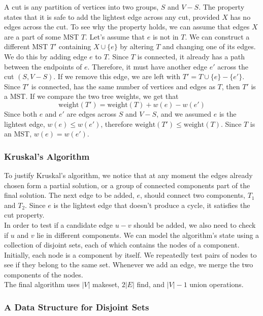 A cut is any partition of vertices into two groups, $S$ and $V - S$.
The property states that it is safe to add the lightest edge across any cut, provided $X$ has no edges across the cut.
To see why the property holds, we can assume that edges $X$ are a part of some MST $T$.
Let's assume that $e$ is not in $T$.
We can construct a different MST $T'$ containing $X \cup \{e\}$ by altering $T$ and changing one of its edges.
We do this by adding edge $e$ to $T$.
Since $T$ is connected, it already has a path between the endpoints of $e$.
Therefore, it must have another edge $e'$ across the cut $(S, V - S)$.
If we remove this edge, we are left with $T' = T \cup \{e\} - \{e'\}$.
Since $T'$ is connected, has the same number of vertices and edges as $T$, then $T'$ is a MST.
If we compare the two tree weights, we get that
$$\text{weight}(T') = \text{weight}(T) + w(e) - w(e')$$
Since both $e$ and $e'$ are edges across $S$ and $V - S$, and we assumed $e$ is the lightest edge, $w(e) \leq w(e')$, therefore $\text{weight}(T') \leq \text{weight}(T)$.
Since $T$ is an MST, $w(e) = w(e')$.

\subsubsection{Kruskal's Algorithm}
To justify Kruskal's algorithm, we notice that at any moment the edges already chosen form a partial solution, or a group of connected components part of the final solution.
The next edge to be added, $e$, should connect two components, $T_1$ and $T_2$.
Since $e$ is the lightest edge that doesn't produce a cycle, it satisfies the cut property.\\
In order to test if a candidate edge $u - v$ should be added, we also need to check if $u$ and $v$ lie in different components.
We can model the algorithm's state using a collection of disjoint sets, each of which contains the nodes of a component.\\
Initially, each node is a component by itself.
We repeatedly test pairs of nodes to see if they belong to the same set.
Whenever we add an edge, we merge the two components of the nodes.\\
The final algorithm uses $|V|$ makeset, $2|E|$ find, and $|V| - 1$ union operations.

\subsubsection{A Data Structure for Disjoint Sets}
